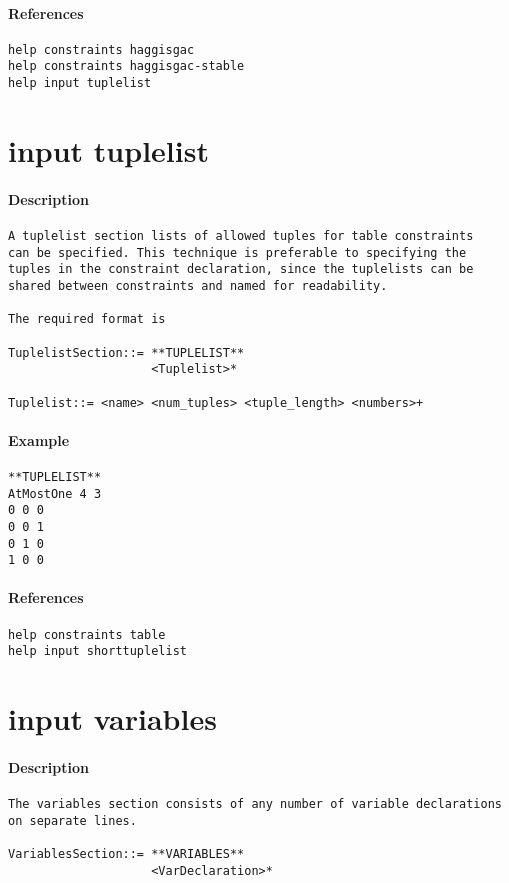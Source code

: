 \paragraph{References}
{\footnotesize
\begin{verbatim}
help constraints haggisgac
help constraints haggisgac-stable
help input tuplelist
\end{verbatim}
}
\section{input tuplelist}
\paragraph{Description}
{\footnotesize
\begin{verbatim}
A tuplelist section lists of allowed tuples for table constraints
can be specified. This technique is preferable to specifying the
tuples in the constraint declaration, since the tuplelists can be
shared between constraints and named for readability.

The required format is

TuplelistSection::= **TUPLELIST**
                    <Tuplelist>*

Tuplelist::= <name> <num_tuples> <tuple_length> <numbers>+
\end{verbatim}
}
\paragraph{Example}
{\footnotesize
\begin{verbatim}
**TUPLELIST**
AtMostOne 4 3
0 0 0
0 0 1
0 1 0
1 0 0
\end{verbatim}
}
\paragraph{References}
{\footnotesize
\begin{verbatim}
help constraints table
help input shorttuplelist
\end{verbatim}
}
\section{input variables}
\paragraph{Description}
{\footnotesize
\begin{verbatim}
The variables section consists of any number of variable declarations
on separate lines.

VariablesSection::= **VARIABLES**
                    <VarDeclaration>*
\end{verbatim}
}
